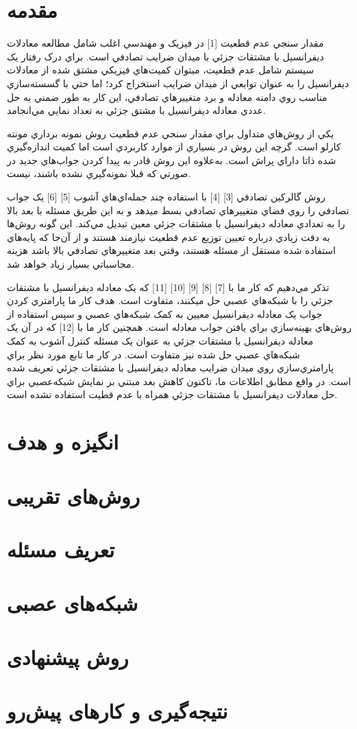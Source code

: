 \newpage
\vspace*{-1cm}
\section*{مقدمه}

مقدار سنجي عدم قطعيت [1] در فيزيک و مهندسي اغلب شامل مطالعه معادلات ديفرانسيل با مشتقات جزئي با ميدان ضرايب تصادفي است. براي درک رفتار يک سيستم شامل عدم قطعيت، ميتوان کميت‌هاي فيزيکي مشتق شده از معادلات ديفرانسيل را به عنوان توابعي از ميدان ضرايب استخراج کرد؛ اما حتي با گسسته‌سازي مناسب روي دامنه معادله و برد متغييرهاي تصادفي، اين کار به طور ضمني به حل عددي معادله ديفرانسيل با مشتق جزئي به تعداد نمايي مي‌انجامد.

يکي از روش‌هاي متداول براي مقدار سنجي عدم قطعيت روش نمونه‌ برداري مونته کارلو است. گرچه اين روش در بسياري از موارد کاربردي است اما کميت اندازه‌گيري شده ذاتا داراي پراش است. به‌علاوه اين روش قادر به پيدا کردن جواب‌هاي جديد در صورتي که قبلا نمونه‌گيري نشده باشند، نيست.

روش گالرکين تصادفي [3] [4] با استفاده چند جمله‌اي‌هاي آشوب [5] [6] يک جواب تصادفي را روي فضاي متغييرهاي تصادفي بسط ميدهد و به اين طريق مسئله با بعد بالا را به تعدادي معادله ديفرانسيل با مشتقات جزئي معين تبديل مي‌کند. اين گونه روش‌ها به دقت زيادي درباره تعيين توزيع عدم قطعيت نيازمند هستند و از آن‌جا که پايه‌هاي استفاده شده مستقل از مسئله هستند، وقتي بعد متغييرهاي تصادفي بالا باشد هزينه محاسباتي بسيار زياد خواهد شد.

تذکر مي‌دهيم که کار ما با [7] [8] [9] [10] [11] که يک معادله ديفرانسيل با مشتقات جزئي را با شبکه‌هاي عصبي حل ميکنند، متفاوت است. هدف کار ما پارامتري کردن جواب يک معادله ديفرانسيل معيين به کمک شبکه‌هاي عصبي و سپس استفاده از روش‌هاي بهينه‌سازي براي يافتن جواب معادله است. همچنين کار ما با [12] که در آن يک معادله ديفرانسيل با مشتقات جزئي به عنوان يک مسئله کنترل آشوب به کمک شبکه‌هاي عصبي حل شده نيز متفاوت است. در کار ما تابع مورد نظر براي پارامتري‌سازي روي ميدان ضرايب معادله ديفرانسيل با مشتقات جزئي تعريف شده است. در واقع مطابق اطلاعات ما، تاکنون کاهش بعد مبتني بر نمايش شبکه‌عصبي براي حل معادلات ديفرانسيل با مشتقات جزئي همراه با عدم قطيت استفاده نشده است.

\section*{انگیزه و هدف}


\section*{روش‌های تقریبی }

\section*{تعریف مسئله }

\section*{شبکه‌های عصبی }

\section*{روش پیشنهادی }

\section*{نتیجه‌گیری و کارهای پیش‌رو}
